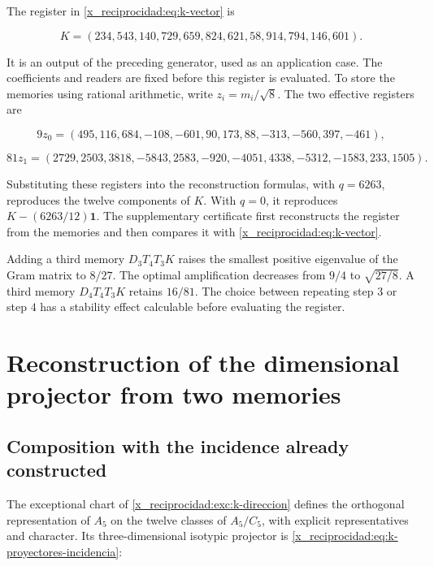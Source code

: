 The register in \eqref{x_reciprocidad:eq:k-vector} is



\begin{equation}
K=(234,543,140,729,659,824,621,58,914,794,146,601).
\label{x_reciprocidad:nuc11:eq:10}
\end{equation}



It is an output of the preceding generator, used as an application case. The coefficients and readers are fixed before this register is evaluated. To store the memories using rational arithmetic, write \(z_i=m_i/\sqrt8\). The two effective registers are



\[
9z_0=(495,116,684,-108,-601,90,173,88,-313,-560,397,-461),
\]





\begin{equation}
81z_1=(2729,2503,3818,-5843,2583,-920,-4051,4338,-5312,-1583,233,1505).
\label{x_reciprocidad:nuc11:eq:11}
\end{equation}



Substituting these registers into the reconstruction formulas, with \(q=6263\), reproduces the twelve components of \(K\). With \(q=0\), it reproduces \(K-(6263/12)\mathbf1\). The supplementary certificate first reconstructs the register from the memories and then compares it with \eqref{x_reciprocidad:eq:k-vector}.

Adding a third memory \(D_3T_4T_3K\) raises the smallest positive eigenvalue of the Gram matrix to \(8/27\). The optimal amplification decreases from \(9/4\) to \(\sqrt{27/8}\). A third memory \(D_4T_4T_3K\) retains \(16/81\). The choice between repeating step \(3\) or step \(4\) has a stability effect calculable before evaluating the register.

\section{Reconstruction of the dimensional projector from two memories}

\subsection{Composition with the incidence already constructed}

The exceptional chart of \cref{x_reciprocidad:exc:k-direccion} defines the
orthogonal representation of \(A_5\) on the twelve classes of
\(A_5/C_5\), with explicit representatives and character.
Its three-dimensional isotypic projector is
\eqref{x_reciprocidad:eq:k-proyectores-incidencia}:



